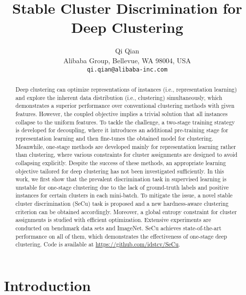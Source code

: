 \documentclass[10pt,twocolumn,letterpaper]{article}
\begin{document}
\title{Stable Cluster Discrimination for Deep Clustering}

\author{Qi Qian\\
Alibaba Group, Bellevue, WA 98004, USA\\
{\tt\small qi.qian@alibaba-inc.com}
}

\maketitle
\ificcvfinal\thispagestyle{empty}\fi

\begin{abstract}
   Deep clustering can optimize representations of instances (i.e., representation learning) and explore the inherent data distribution (i.e., clustering) simultaneously, which demonstrates a superior performance over conventional clustering methods with given features. However, the coupled objective implies a trivial solution that all instances collapse to the uniform features. To tackle the challenge, a two-stage training strategy is developed for decoupling, where it introduces an additional pre-training stage for representation learning and then fine-tunes the obtained model for clustering. Meanwhile, one-stage methods are developed mainly for representation learning rather than clustering, where various constraints for cluster assignments are designed to avoid collapsing explicitly. Despite the success of these methods, an appropriate learning objective tailored for deep clustering has not been investigated sufficiently. In this work, we first show that the prevalent discrimination task in supervised learning is unstable for one-stage clustering due to the lack of ground-truth labels and positive instances for certain clusters in each mini-batch. To mitigate the issue, a novel stable cluster discrimination (SeCu) task is proposed and a new hardness-aware clustering criterion can be obtained accordingly. Moreover, a global entropy constraint for cluster assignments is studied with efficient optimization. Extensive experiments are conducted on benchmark data sets and ImageNet. SeCu achieves state-of-the-art performance on all of them, which demonstrates the effectiveness of one-stage deep clustering. Code is available at \url{https://github.com/idstcv/SeCu}.
\end{abstract}

\section{Introduction}
\end{document}
